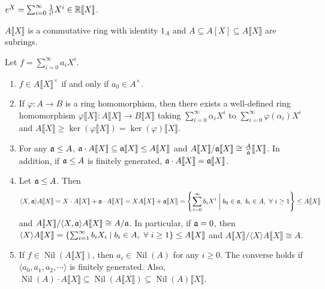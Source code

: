 \begin{example}
    $e^X = \sum_{i=0}^\infty \frac{1}{i!} X^i \in \mathbb{R} \llbracket X \rrbracket$.
\end{example}

\begin{theorem}
    $A \llbracket X \rrbracket$ is a commutative ring with identity $1_A$ and $A \subseteq A[X] \subseteq A \llbracket X \rrbracket$ are subrings.
\end{theorem}

\begin{proposition}
    Let $f = \sum_{i=0}^\infty a_iX^i$.
    \begin{enumerate}
        \item $f \in A \llbracket X \rrbracket^\times$ if and only if $a_0 \in A^\times$.
        \item If $\varphi: A \to B$ is a ring homomorphism, then there exists a well-defined ring homomorphism $\varphi\llbracket X \rrbracket: A\llbracket X \rrbracket \to B\llbracket X \rrbracket$ taking $\sum_{i=0}^\infty \alpha_iX^i$ to $\sum_{i=0}^\infty \varphi(\alpha_i)X^i$ and $A\llbracket X \rrbracket \geq \ker(\varphi \llbracket X \rrbracket) = \ker(\varphi)\llbracket X \rrbracket$. 
        \item For any $\mathfrak{a} \leq A$, $\mathfrak{a} \cdot A \llbracket X \rrbracket \subseteq \mathfrak{a} \llbracket X \rrbracket \leq A\llbracket X \rrbracket$ and $A \llbracket X \rrbracket / \mathfrak{a} \llbracket X \rrbracket \cong \frac{A}{\mathfrak{a}} \llbracket X \rrbracket$. In addition, if $\mathfrak{a} \leq A$ is finitely generated, $\mathfrak{a} \cdot A\llbracket X \rrbracket = \mathfrak{a} \llbracket X \rrbracket$.
        \item Let $\mathfrak{a} \leq A$. Then 
            \[\langle X,\mathfrak{a} \rangle A\llbracket X \rrbracket = X \cdot A \llbracket X \rrbracket + \mathfrak{a} \cdot A \llbracket X \rrbracket = XA \llbracket X \rrbracket + \mathfrak{a} \llbracket X \rrbracket = \left\{\sum_{i=0}^\infty b_iX^i \mathrel{\bigg |} b_0 \in \mathfrak{a},\ b_i \in A, \ \forall \  i \geq 1\right\} \leq A \llbracket X \rrbracket\] 
            and $A \llbracket X \rrbracket / \langle X,\mathfrak{a} \rangle A \llbracket X \rrbracket \cong A/\mathfrak{a}$. In particular, if $\mathfrak{a} = 0$, then $\langle X \rangle A \llbracket X \rrbracket = \{\sum_{i=1}^\infty b_iX_i \mid b_i \in A, \ \forall \  i \geq 1\} \leq A\llbracket X \rrbracket$ and $A\llbracket X \rrbracket / \langle X \rangle A \llbracket X \rrbracket \cong A$. 
        \item If $f \in \operatorname{Nil}(A\llbracket X \rrbracket)$, then $a_i \in \operatorname{Nil}(A)$ for any $i \geq 0$. The converse holds if $\langle a_0,a_1,a_2,\cdots \rangle$ is finitely generated. Also, $\operatorname{Nil}(A) \cdot A \llbracket X \rrbracket \subseteq \operatorname{Nil}(A \llbracket X \rrbracket) \subseteq \operatorname{Nil}(A) \llbracket X \rrbracket$.

\end{enumerate}
\end{proposition}
